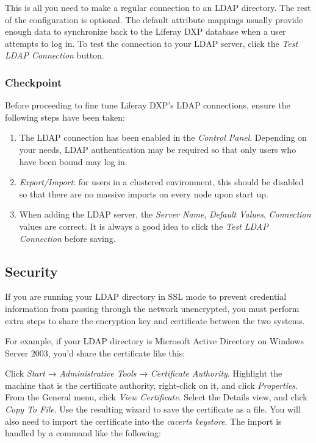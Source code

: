 This is all you need to make a regular connection to an LDAP directory.
The rest of the configuration is optional. The default attribute
mappings usually provide enough data to synchronize back to the Liferay
DXP database when a user attempts to log in. To test the connection to
your LDAP server, click the \emph{Test LDAP Connection} button.

\subsubsection{Checkpoint}\label{checkpoint-3}

Before proceeding to fine tune Liferay DXP's LDAP connections, ensure
the following steps have been taken:

\begin{enumerate}
\def\labelenumi{\arabic{enumi}.}
\item
  The LDAP connection has been enabled in the \emph{Control Panel}.
  Depending on your needs, LDAP authentication may be required so that
  only users who have been bound may log in.
\item
  \emph{Export/Import}: for users in a clustered environment, this
  should be disabled so that there are no massive imports on every node
  upon start up.
\item
  When adding the LDAP server, the \emph{Server Name}, \emph{Default
  Values}, \emph{Connection} values are correct. It is always a good
  idea to click the \emph{Test LDAP Connection} before saving.
\end{enumerate}

\subsection{Security}\label{security-1}

If you are running your LDAP directory in SSL mode to prevent credential
information from passing through the network unencrypted, you must
perform extra steps to share the encryption key and certificate between
the two systems.

For example, if your LDAP directory is Microsoft Active Directory on
Windows Server 2003, you'd share the certificate like this:

Click \emph{Start} → \emph{Administrative Tools} → \emph{Certificate
Authority}. Highlight the machine that is the certificate authority,
right-click on it, and click \emph{Properties}. From the General menu,
click \emph{View Certificate}. Select the Details view, and click
\emph{Copy To File}. Use the resulting wizard to save the certificate as
a file. You will also need to import the certificate into the
\emph{cacerts keystore}. The import is handled by a command like the
following:

